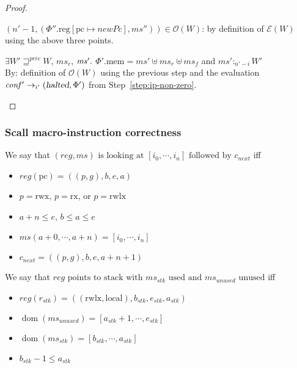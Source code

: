 \documentclass[a4paper]{article}
\newcommand{\update}[2]{[#1 \mapsto #2]}
\DeclareMathOperator{\dom}{dom}
\newcommand\lau[1]{{\color{purple} \sf \footnotesize {LS: #1}}\\}
\renewcommand\lau[1]{}
\newcommand{\var}[1]{\mathit{#1}}
\newcommand{\hs}{\var{ms}}
\newcommand{\ms}{\hs}
\newcommand{\pcreg}{\mathrm{pc}}
\newcommand{\reg}{\var{reg}}
\newcommand{\heap}{\var{mem}}
\newcommand{\stk}{\var{stk}}
\newcommand{\plainproj}[1]{\mathrm{#1}}
\newcommand{\memheap}[1][\Phi]{#1.\plainproj{mem}}
\newcommand{\memreg}[1][\Phi]{#1.\plainproj{reg}}
\newcommand{\halted}{\textsl{halted}}
\newcommand{\futurestr}{\mathbin{\sqsupseteq}^{\var{priv}}}
\newcommand{\heapSat}[3][\heap]{#1 :_{#2} #3}
\newcommand{\asmType}{\plaindom{AsmType}}
\newcommand{\plaindom}[1]{\mathrm{#1}}
\newcommand{\intr}[2]{\mathcal{#1}}
\newcommand{\exprintr}[1]{\intr{E}{#1}}
\newcommand{\stder}{\exprintr{\asmType}}
\newcommand{\observations}{\mathcal{O}}
\newcommand{\npair}[2][n]{\left(#1,#2 \right)}
\newcommand{\plainperm}[1]{\mathrm{#1}}
\newcommand{\exec}{\plainperm{rx}}
\newcommand{\rwx}{\plainperm{rwx}}
\newcommand{\rwlx}{\plainperm{rwlx}}
\newcommand{\local}{\plainperm{local}}
\newcommand{\step}[1][]{\rightarrow_{#1}}
\begin{document}
\begin{proof}
\begin{enumproof}
\begin{enumproof}
      $\npair[n'-1]{(\memreg[\Phi'']\update{\pcreg}{\var{newPc}},\ms'')}\in\observations(W)$:
      by definition of $\stder(W)$ using the above three points.
    \item $\exists W' \futurestr W$, $\hs_r$, $\hs' \ldotp$
      $\memheap[\Phi'] = \hs' \uplus \hs_r \uplus \ms_f$ and $\heapSat[\hs']{n'-i}{W'}$\\
      By: definition of $\observations(W)$ using the previous step and the
      evaluation $\var{conf'}\step[i'] (\halted,\Phi')$ from
      Step~\ref{step:ip-non-zero}.
    \end{enumproof}
  \end{enumproof}
\end{proof}

\subsubsection{Scall macro-instruction correctness}
\begin{definition}
  We say that $(\reg,\ms) \text{ is looking at } [i_0,\cdots,i_n] \text{ followed by } c_{\mathit{next}}$ 
  iff
  \begin{itemize}
  \item $\reg(\pcreg) = ((p,g),b,e,a)$
  \item $p = \rwx$, $p = \exec$, or $p = \rwlx$
  \item $a+n\leq e$, $b\leq a\leq e$
  \item $\ms(a+0,\cdots,a+n) = [i_0,\cdots,i_n]$
  \item $c_{\mathit{next}} = ((p,g),b,e,a+n+1)$
  \end{itemize}
\end{definition}

\begin{definition}
  We say that $\reg \text{ points to stack with $\ms_\stk$ used and $\ms_{\mathit{unused}}$ unused}$
  iff
  \begin{itemize}
  \item $\reg(r_\stk) =((\rwlx,\local),b_\stk,e_\stk,a_\stk)$
  \item $\dom(\ms_{\mathit{unused}}) = [a_\stk+1,\cdots,e_\stk]$
  \item $\dom(\ms_\stk) = [b_\stk,\cdots,a_\stk]$ \lau{Maybe make it clear what happens when $\ms_\stk$ is empty}
  \item $b_\stk - 1\leq a_\stk$
  \end{itemize}
\end{definition}
\end{document}
